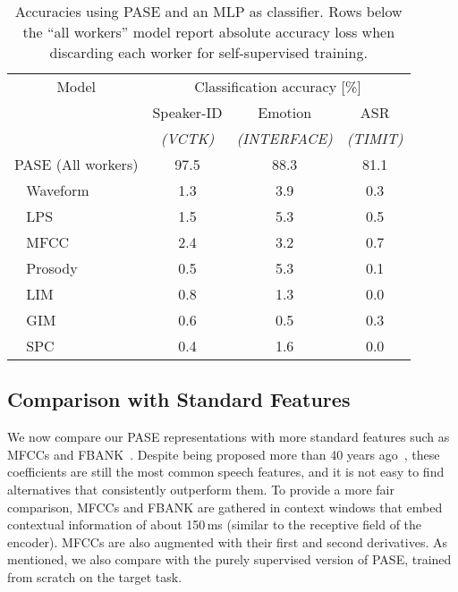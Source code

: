 \documentclass[a4paper]{article}
\begin{document}
\begin{table}[t]
\centering
\caption{Accuracies using PASE and an MLP as classifier. Rows below the ``all workers'' model report absolute accuracy loss when discarding each worker for self-supervised training.}
\label{tab:ablation}
\setlength{\tabcolsep}{4pt}
\begin{tabular}{l|ccc}
    \hline 
     \multicolumn{1}{c|}{Model} & \multicolumn{3}{c}{Classification accuracy [\%]} \\
            & Speaker-ID & Emotion & ASR \\
            & \textit{(VCTK)} & \textit{(INTERFACE)} & \textit{(TIMIT)} \\
     \hline
     
PASE (All workers)  & 97.5 & 88.3 &  81.1\\

~ Waveform & 1.3 & 3.9 & 0.3 \\
     
~ LPS & 1.5 & 5.3 & 0.5 \\
    
~ MFCC & 2.4 & 3.2 & 0.7 \\
     
~ Prosody & 0.5 & 5.3 & 0.1 \\

~ LIM & 0.8 & 1.3 & 0.0 \\

~ GIM & 0.6 & 0.5  & 0.3 \\

~ SPC & 0.4 & 1.6 & 0.0 \\

     \hline
\end{tabular}
\end{table}


\subsection{Comparison with Standard Features}

We now compare our PASE representations with more standard features such as MFCCs and FBANK~\cite{brian_mcfee_2019_2564164}. Despite being proposed more than 40 years ago~\cite{Davis80-COP}, these coefficients are still the most common speech features, and it is not easy to find alternatives that consistently outperform them. To provide a more fair comparison, MFCCs and FBANK are gathered in context windows that embed contextual information of about 150\,ms (similar to the receptive field of the encoder). MFCCs are also augmented with their first and second derivatives. As mentioned, we also compare with the purely supervised version of PASE, trained from scratch on the target task.  
\end{document}
